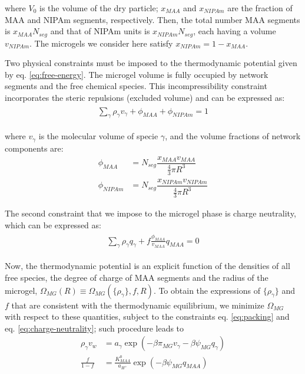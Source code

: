 \noindent where $V_0$ is the volume of the dry particle; $x_{MAA}$ and $x_{NIPAm}$ are the fraction of MAA and NIPAm segments, respectively.
Then, the total number MAA segments is $x_{MAA}N_{seg}$ and that of NIPAm units is $x_{NIPAm}N_{seg}$, each having a volume $v_{NIPAm}$.
The microgels we consider here satisfy $x_{NIPAm}=1-x_{MAA}$.


Two physical constraints must be imposed to the thermodynamic potential given by eq. \ref{eq:free-energy}.
The microgel volume is fully occupied by network segments and the free chemical species.
This incompressibility constraint incorporates the steric repulsions (excluded volume) and can be expressed as:
%
%
\begin{align}
\begin{aligned}
\sum_{\gamma } \rho_\gamma v_\gamma  + \phi_{MAA} + \phi_{NIPAm} = 1
\end{aligned}
\label{eq:packing}
\end{align}



\noindent where $v_\gamma$ is the molecular volume of specie $\gamma$, and
the volume fractions of network components are: 
%
%
\begin{align}
\phi_{MAA}&=N_{seg}\dfrac{x_{MAA}v_{MAA}}{\frac{4}{3}\pi R^3}\\
\phi_{NIPAm}&=N_{seg}\dfrac{x_{NIPAm}v_{NIPAm}}{\frac{4}{3}\pi R^3}
\end{align}



The second constraint that we impose to the microgel phase is charge neutrality, which can  be expressed as: 
%
%
\begin{align}
\begin{aligned}
\sum_{\gamma  } \rho_\gamma q_\gamma + f\frac{\phi_{MAA}}{v_{MAA}}q_{MAA}=0
\end{aligned}
\label{eq:charge-neutrality}
\end{align}


Now, the thermodynamic potential is an explicit function of the densities of all free species, the degree of charge of MAA segments and the radius of the microgel, $\Omega_{MG}(R)\equiv\Omega_{MG}(\{\rho_\gamma\},f,R)$.
To obtain the expressions of $\{\rho_\gamma\}$ and $f$ that are consistent with the thermodynamic equilibrium, we minimize $\Omega_{MG}$ with respect to these quantities, subject to the constraints eq. \ref{eq:packing} and eq. \ref{eq:charge-neutrality}; such procedure leads to
%
%
\begin{align}
\rho_\gamma v_w &= a_\gamma \exp(-\beta\pi_{MG}v_\gamma -\beta\psi_{MG}q_{\gamma})\\
\frac{f}{1-f}&= \frac{K^0_{MAA}}{a_{H^+}}\exp(-\beta\psi_{MG}q_{MAA})\label{eq:fcharge}
\end{align}


